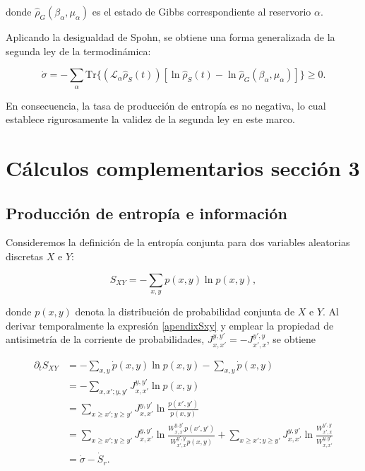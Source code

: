 \begin{appendixs}
donde $\hat{\rho}_{G}(\beta_{\alpha},\mu_{\alpha})$ es el estado de Gibbs correspondiente al reservorio $\alpha$.

Aplicando la desigualdad de Spohn, se obtiene una forma generalizada de la segunda ley de la termodinámica:

\begin{equation*}
    \dot{\sigma} = - \sum_{\alpha} \text{Tr}\{(\mathcal{L}_{\alpha}\hat{\rho}_{S}(t)) [\ln \hat{\rho}_{S}(t) - \ln \hat{\rho}_{G}(\beta_{\alpha},\mu_{\alpha})] \} \geq 0.
\end{equation*}

En consecuencia, la tasa de producción de entropía es no negativa, lo cual establece rigurosamente la validez de la segunda ley en este marco.
\label{apendix:thermolaws}

\newpage 

    \section{Cálculos complementarios sección 3}
    \subsection{Producción de entropía e información}

Consideremos la definición de la entropía conjunta para dos variables aleatorias discretas \(X\) e \(Y\):

\begin{equation}
    S_{XY} = - \sum_{x,y} p(x,y) \ln p(x,y),
    \label{apendixSxy}
\end{equation}

donde \(p(x,y)\) denota la distribución de probabilidad conjunta de \(X\) e \(Y\).  
Al derivar temporalmente la expresión \eqref{apendixSxy} y emplear la propiedad de antisimetría de la corriente de probabilidades, \(J_{x,x'}^{y,y'} = - J_{x',x}^{y',y}\), se obtiene

\begin{align*}
    \partial_{t}S_{XY} 
    &= - \sum_{x,y} \dot{p}(x,y) \ln p(x,y) - \sum_{x,y} \dot{p}(x,y) \\
    &= - \sum_{x,x';y,y'} J_{x,x'}^{y,y'} \ln p(x,y)  \\
    &= \sum_{x \geq x'; y\geq y'} J_{x,x'}^{y,y'} \ln \frac{p(x',y')}{p(x,y)} \\
    &= \sum_{x \geq x'; y\geq y'} J_{x,x'}^{y,y'} \ln \frac{W_{x,x'}^{y,y'} p(x',y')}{W_{x',x}^{y',y} p(x,y)} 
     +  \sum_{x \geq x'; y\geq y'} J_{x,x'}^{y,y'} \ln \frac{W_{x',x}^{y',y}}{W_{x,x'}^{y,y'}} \\
    &= \dot{\sigma} - \dot{S}_{r}.
\end{align*}


\end{appendixs}
